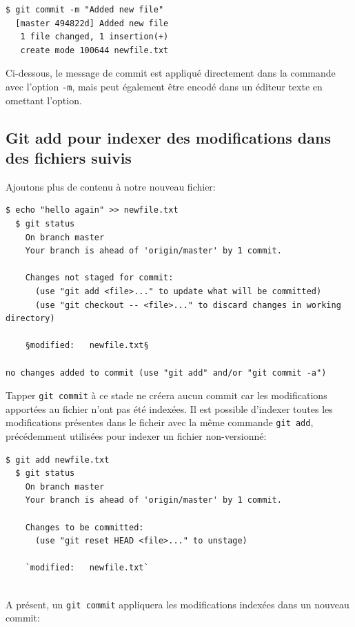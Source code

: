 \documentclass{../../common/tufte-latex/tufte-handout}
\begin{document}
\begin{lstlisting}[style=BashInputStyle]
  $ git commit -m "Added new file"
  [master 494822d] Added new file
   1 file changed, 1 insertion(+)
   create mode 100644 newfile.txt
\end{lstlisting}

Ci-dessous, le message de commit est appliqué directement dans la commande avec l'option \texttt{-m}, mais peut également être encodé dans un éditeur texte en omettant l'option.

\subsection{Git add pour indexer des modifications dans des fichiers suivis}

Ajoutons plus de contenu à notre nouveau fichier:

\begin{lstlisting}[style=BashInputStyle]
  $ echo "hello again" >> newfile.txt
  $ git status
    On branch master
    Your branch is ahead of 'origin/master' by 1 commit.
  
    Changes not staged for commit:
      (use "git add <file>..." to update what will be committed)
      (use "git checkout -- <file>..." to discard changes in working directory)
   
    §modified:   newfile.txt§
   
no changes added to commit (use "git add" and/or "git commit -a")
\end{lstlisting}

Tapper \texttt{git commit} à ce stade ne créera aucun commit car les modifications apportées au fichier n'ont pas été indexées.
Il est possible d'indexer toutes les modifications présentes dans le ficheir avec la même commande \texttt{git add}, précédemment utilisées pour indexer un fichier non-versionné:

\begin{lstlisting}[style=BashInputStyle]
  $ git add newfile.txt
  $ git status
    On branch master
    Your branch is ahead of 'origin/master' by 1 commit.
  
    Changes to be committed:
      (use "git reset HEAD <file>..." to unstage)
  
    `modified:   newfile.txt`
 
\end{lstlisting}

A présent, un \texttt{git commit} appliquera les modifications indexées dans un nouveau commit:
\end{document}
